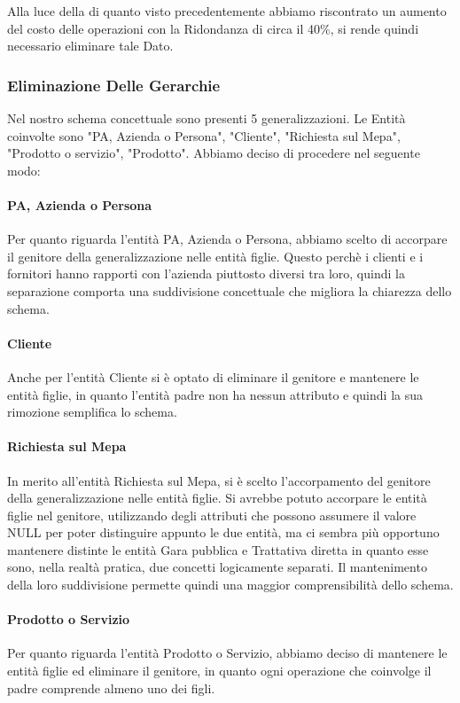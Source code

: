 Alla luce della di quanto visto precedentemente abbiamo riscontrato un aumento del costo delle operazioni con la Ridondanza di circa il 40\%, si rende quindi necessario eliminare tale Dato.



\subsubsection{Eliminazione Delle Gerarchie}

Nel nostro schema concettuale sono presenti 5 generalizzazioni. Le Entità coinvolte sono "PA, Azienda o Persona", "Cliente", "Richiesta sul Mepa", "Prodotto o servizio", "Prodotto".
\newline
Abbiamo deciso di procedere nel seguente modo:

\paragraph{PA, Azienda o Persona}
Per quanto riguarda l'entità PA, Azienda o Persona, abbiamo scelto di accorpare il genitore della generalizzazione nelle entità figlie. Questo perchè i clienti e i fornitori hanno rapporti con l'azienda piuttosto diversi tra loro, quindi la separazione comporta una suddivisione concettuale che migliora la chiarezza dello schema.
\paragraph{Cliente}
Anche per l'entità Cliente si è optato di eliminare il genitore e mantenere le entità figlie, in quanto l'entità padre non ha nessun attributo e quindi la sua rimozione semplifica lo schema.
\paragraph{Richiesta sul Mepa}
In merito all'entità Richiesta sul Mepa, si è scelto l'accorpamento del genitore della generalizzazione nelle entità figlie. Si avrebbe potuto accorpare le entità figlie nel genitore, utilizzando degli attributi che possono assumere il valore NULL per poter distinguire appunto le due entità, ma ci sembra più opportuno mantenere distinte le entità Gara pubblica e Trattativa diretta in quanto esse sono, nella realtà pratica, due concetti logicamente separati. Il mantenimento della loro suddivisione permette quindi una maggior comprensibilità dello schema.
\paragraph{Prodotto o Servizio}
Per quanto riguarda l'entità Prodotto o Servizio, abbiamo deciso di mantenere le entità figlie ed eliminare il genitore, in quanto ogni operazione che coinvolge il padre comprende almeno uno dei figli.
